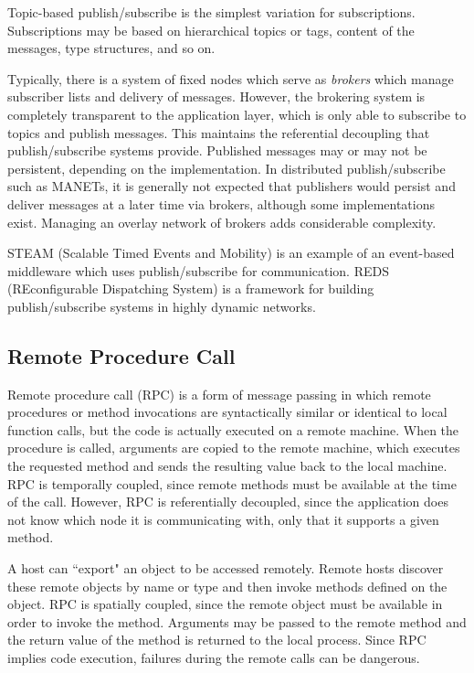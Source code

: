 Topic-based publish/subscribe is the simplest variation for subscriptions. Subscriptions may be based on hierarchical topics or tags, content of the messages, type structures, and so on.

Typically, there is a system of fixed nodes which serve as \textit{brokers} which manage subscriber lists and delivery of messages. However, the brokering system is completely transparent to the application layer, which is only able to subscribe to topics and publish messages. This maintains the referential decoupling that publish/subscribe systems provide. Published messages may or may not be persistent, depending on the implementation. In distributed publish/subscribe such as MANETs, it is generally not expected that publishers would persist and deliver messages at a later time via brokers\cite{psfaces}, although some implementations exist\cite{reds}. Managing an overlay network of brokers adds considerable complexity.

STEAM (Scalable Timed Events and Mobility)\cite{steam} is an example of an event-based middleware which uses publish/subscribe for communication. REDS (REconfigurable Dispatching System) is a framework for building publish/subscribe systems in highly dynamic networks.

\subsection{Remote Procedure Call}

Remote procedure call (RPC) is a form of message passing in which remote procedures or method invocations are syntactically similar or identical to local function calls, but the code is actually executed on a remote machine. When the procedure is called, arguments are copied to the remote machine, which executes the requested method and sends the resulting value back to the local machine. RPC is temporally coupled, since remote methods must be available at the time of the call. However, RPC is referentially decoupled, since the application does not know which node it is communicating with, only that it supports a given method.

A host can ``export" an object to be accessed remotely. Remote hosts discover these remote objects by name or type and then invoke methods defined on the object. RPC is spatially coupled, since the remote object must be available in order to invoke the method. Arguments may be passed to the remote method and the return value of the method is returned to the local process. Since RPC implies code execution, failures during the remote calls can be dangerous\cite{distbook}.

